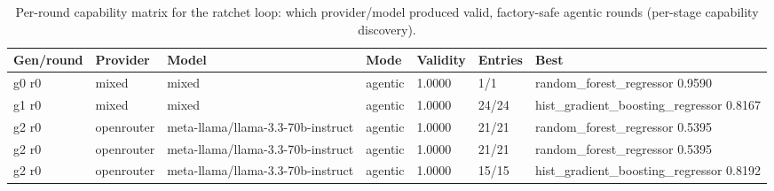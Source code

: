 \begin{table}[H]
\centering\small
\caption{Per-round capability matrix for the ratchet loop: which provider/model produced valid, factory-safe agentic rounds (per-stage capability discovery).}
\label{tab:ratchet-rounds-ratchet-ledger-energy}
\begin{tabular}{lllllll}
\toprule
Gen/round & Provider & Model & Mode & Validity & Entries & Best \\
\midrule
g0 r0 & mixed & mixed & agentic & 1.0000 & 1/1 & random\_forest\_regressor 0.9590 \\
g1 r0 & mixed & mixed & agentic & 1.0000 & 24/24 & hist\_gradient\_boosting\_regressor 0.8167 \\
g2 r0 & openrouter & meta-llama/llama-3.3-70b-instruct & agentic & 1.0000 & 21/21 & random\_forest\_regressor 0.5395 \\
g2 r0 & openrouter & meta-llama/llama-3.3-70b-instruct & agentic & 1.0000 & 21/21 & random\_forest\_regressor 0.5395 \\
g2 r0 & openrouter & meta-llama/llama-3.3-70b-instruct & agentic & 1.0000 & 15/15 & hist\_gradient\_boosting\_regressor 0.8192 \\
\bottomrule
\end{tabular}
\end{table}
